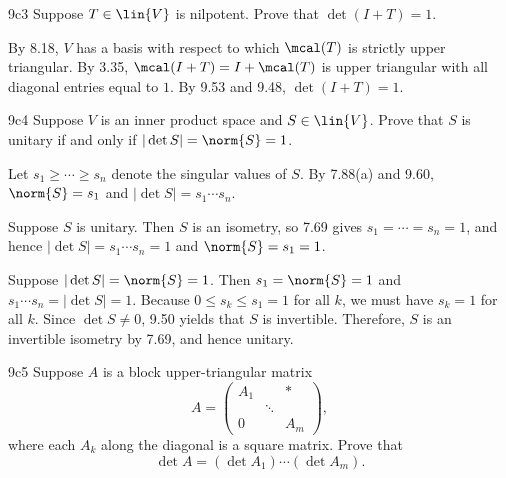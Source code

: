 \begin{exercise}{9c3}
    Suppose $T \in \lin{V}$ is nilpotent.
    Prove that $\det(I + T) = 1$.
\end{exercise}

\begin{sol}
    By 8.18, $V$ has a basis with respect to which $\mcal(T)$ is strictly upper triangular.
    By 3.35, $\mcal(I + T) = I + \mcal(T)$ is upper triangular with all diagonal entries equal to $1$.
    By 9.53 and 9.48, $\det(I + T) = 1$.
\end{sol}

\begin{exercise}{9c4}
    Suppose $V$ is an inner product space and $S \in \lin{V}$.
    Prove that $S$ is unitary if and only if $|\det S| = \norm{S} = 1$.
\end{exercise}

\begin{sol}
    Let $s_1 \geq \cdots \geq s_n$ denote the singular values of $S$.
    By 7.88(a) and 9.60, $\norm{S} = s_1$ and $|\det S| = s_1 \cdots s_n$.

    \rightimp Suppose $S$ is unitary.
    Then $S$ is an isometry, so 7.69 gives $s_1 = \cdots = s_n = 1$, and hence $|\det S| = s_1 \cdots s_n = 1$ and $\norm{S} = s_1 = 1$.

    \leftimp Suppose $|\det S| = \norm{S} = 1$.
    Then $s_1 = \norm{S} = 1$ and $s_1 \cdots s_n = |\det S| = 1$.
    Because $0 \leq s_k \leq s_1 = 1$ for all $k$, we must have $s_k = 1$ for all $k$.
    Since $\det S \neq 0$, 9.50 yields that $S$ is invertible.
    Therefore, $S$ is an invertible isometry by 7.69, and hence unitary.
\end{sol}

\begin{exercise}{9c5}
    Suppose $A$ is a block upper-triangular matrix
    \[
        A = \begin{pmatrix}
            A_1 & & * \\
            & \ddots & \\
            0 & & A_m
        \end{pmatrix},
    \]
    where each $A_k$ along the diagonal is a square matrix.
    Prove that
    \[
        \det A = (\det A_1) \cdots (\det A_m).
    \]
\end{exercise}

